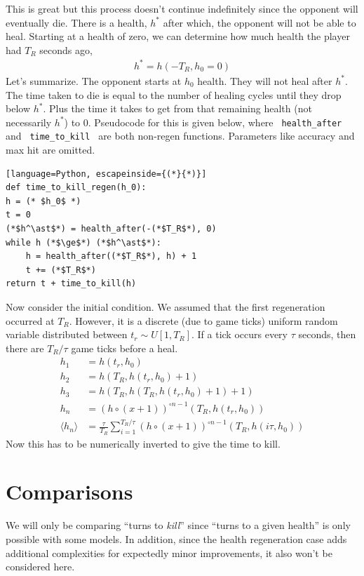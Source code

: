 		This is great but this process doesn't continue indefinitely since the opponent will eventually die. There is a health, $h^*$ after which, the opponent will not be able to heal. Starting at a health of zero, we can determine how much health the player had $T_R$ seconds ago,
		\begin{align}
			h^* = h(-T_R, h_0=0)
		\end{align}
		Let's summarize. The opponent starts at $h_0$ health. They will not heal after $h^*$. The time taken to die is equal to the number of healing cycles until they drop below $h^*$. Plus the time it takes to get from that remaining health (not necessarily $h^*$) to 0. Pseudocode for this is given below, where \verb| health_after | and \verb| time_to_kill | are both non-regen functions. Parameters like accuracy and max hit are omitted.

		\begin{lstlisting}[language=Python, escapeinside={(*}{*)}]
def time_to_kill_regen(h_0):
h = (* $h_0$ *)
t = 0
(*$h^\ast$*) = health_after(-(*$T_R$*), 0)
while h (*$\ge$*) (*$h^\ast$*):
	h = health_after((*$T_R$*), h) + 1
	t += (*$T_R$*)
return t + time_to_kill(h)
\end{lstlisting}


		Now consider the initial condition. We assumed that the first regeneration occurred at $T_R$. However, it is a discrete (due to game ticks) uniform random variable distributed between $t_r \sim U[1, T_R]$. If a tick occurs every $\tau$ seconds, then there are $T_R/\tau$ game ticks before a heal.
		\begin{align}
			h_1 &= h(t_r, h_0) \\
			h_2 &= h(T_R, h(t_r, h_0) + 1) \\
			h_3 &= h(T_R, h(T_R, h(t_r, h_0) + 1) + 1) \\
			h_n &= (h\circ (x+1))^{\circ n-1}(T_R, h(t_r, h_0)) \\
			\langle h_n \rangle &= \frac{\tau}{T_R}\sum_{i=1}^{T_R/\tau} (h\circ (x+1))^{\circ n-1}(T_R, h(i\tau, h_0))
		\end{align}
		Now this has to be numerically inverted to give the time to kill.

	\section{Comparisons}
		We will only be comparing ``turns to \textit{kill}'' since ``turns to a given health'' is only possible with some models. In addition, since the health regeneration case adds additional complexities for expectedly minor improvements, it also won't be considered here.

